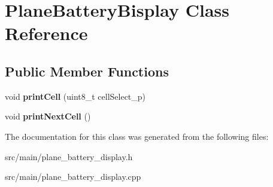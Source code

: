 \hypertarget{class_plane_battery_bisplay}{}\section{Plane\+Battery\+Bisplay Class Reference}
\label{class_plane_battery_bisplay}
\subsection*{Public Member Functions}
\begin{DoxyCompactItemize}
\item 
\mbox{\label{class_plane_battery_bisplay_a2e5a1c0a536c707a2d02562210fa8d67}} 
void {\bfseries print\+Cell} (uint8\+\_\+t cell\+Select\+\_\+p)
\item 
\mbox{\label{class_plane_battery_bisplay_ae3c48c207bc32d8b76b7d5790574de60}} 
void {\bfseries print\+Next\+Cell} ()
\end{DoxyCompactItemize}


The documentation for this class was generated from the following files\+:\begin{DoxyCompactItemize}
\item 
src/main/plane\+\_\+battery\+\_\+display.\+h\item 
src/main/plane\+\_\+battery\+\_\+display.\+cpp\end{DoxyCompactItemize}
